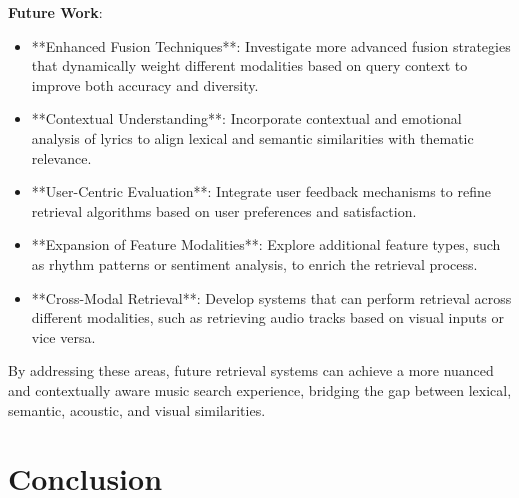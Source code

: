 \documentclass[sigconf]{acmart}
\begin{document}
\textbf{Future Work}:
\begin{itemize}
    \item **Enhanced Fusion Techniques**: Investigate more advanced fusion strategies that dynamically weight different modalities based on query context to improve both accuracy and diversity.
    
    \item **Contextual Understanding**: Incorporate contextual and emotional analysis of lyrics to align lexical and semantic similarities with thematic relevance.
    
    \item **User-Centric Evaluation**: Integrate user feedback mechanisms to refine retrieval algorithms based on user preferences and satisfaction.
    
    \item **Expansion of Feature Modalities**: Explore additional feature types, such as rhythm patterns or sentiment analysis, to enrich the retrieval process.
    
    \item **Cross-Modal Retrieval**: Develop systems that can perform retrieval across different modalities, such as retrieving audio tracks based on visual inputs or vice versa.
\end{itemize}

By addressing these areas, future retrieval systems can achieve a more nuanced and contextually aware music search experience, bridging the gap between lexical, semantic, acoustic, and visual similarities.

\section{Conclusion}
\label{sec:conclusion}

\end{document}
